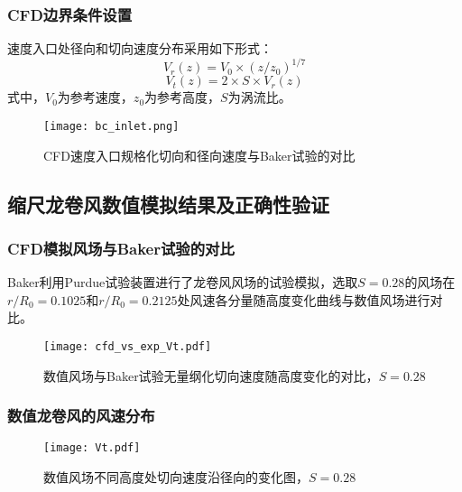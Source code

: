 \begin{frame}
  \frametitle{CFD边界条件设置}

  速度入口处径向和切向速度分布采用如下形式：
  \begin{equation}\label{eqn:Vr}
    V_r(z) = V_0 \times (z/z_0)^{1/7}
  \end{equation}
  \begin{equation}\label{eqn:Vt}
    V_t(z) = 2 \times S \times V_r(z)
  \end{equation}
  式中，$V_0$为参考速度，$z_0$为参考高度，$S$为涡流比。

  \begin{figure}
    \centering
    \texttt{[image: bc\_inlet.png]}
    \caption*{CFD速度入口规格化切向和径向速度与Baker试验的对比}
    \label{fig:bc-inlet}
  \end{figure}
\end{frame}

\subsection{缩尺龙卷风数值模拟结果及正确性验证}

\begin{frame}
  \frametitle{CFD模拟风场与Baker试验的对比} 
  Baker利用Purdue试验装置进行了龙卷风风场的试验模拟，选取$S=0.28$的风场在$r/R_0=0.1025$和$r/R_0=0.2125$处风速各分量随高度变化曲线与数值风场进行对比。
  \begin{figure}[!htbp]
    \centering
    \texttt{[image: cfd\_vs\_exp\_Vt.pdf]}
    \caption*{数值风场与Baker试验无量纲化切向速度随高度变化的对比，$S=0.28$}
    \label{fig:cfd_vs_exp_Vt}
  \end{figure}
\end{frame}

\begin{frame}
  \frametitle{数值龙卷风的风速分布}
  \begin{figure}
    \centering
    \texttt{[image: Vt.pdf]}
    \caption*{数值风场不同高度处切向速度沿径向的变化图，$S=0.28$}
    \label{fig:Vt}
  \end{figure}


\end{frame}

